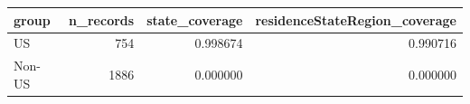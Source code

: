 \begin{tabular}{lrrr}
\toprule
group & n\_records & state\_coverage & residenceStateRegion\_coverage \\
\midrule
US & 754 & 0.998674 & 0.990716 \\
Non-US & 1886 & 0.000000 & 0.000000 \\
\bottomrule
\end{tabular}
